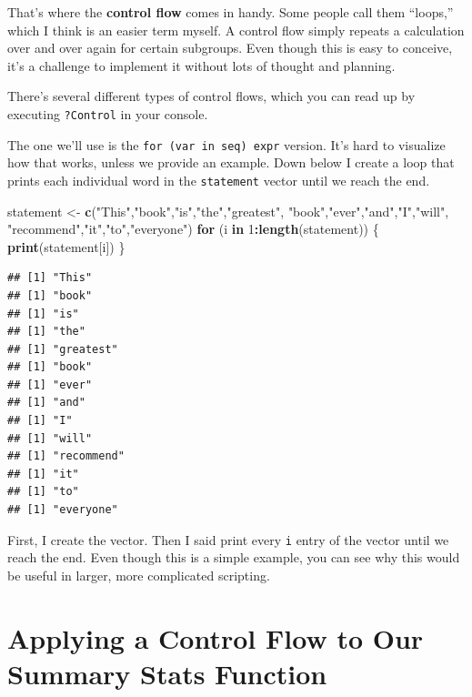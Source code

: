 \documentclass[
]{book}
\newenvironment{Shaded}{\begin{snugshade}}{\end{snugshade}}
\newcommand{\ControlFlowTok}[1]{\textcolor[rgb]{0.13,0.29,0.53}{\textbf{#1}}}
\newcommand{\DecValTok}[1]{\textcolor[rgb]{0.00,0.00,0.81}{#1}}
\newcommand{\KeywordTok}[1]{\textcolor[rgb]{0.13,0.29,0.53}{\textbf{#1}}}
\newcommand{\NormalTok}[1]{#1}
\newcommand{\OperatorTok}[1]{\textcolor[rgb]{0.81,0.36,0.00}{\textbf{#1}}}
\newcommand{\StringTok}[1]{\textcolor[rgb]{0.31,0.60,0.02}{#1}}
\begin{document}
\begin{center}
That's where the \textbf{control flow} comes in handy. Some people call them ``loops,'' which I think is an easier term myself. A control flow simply repeats a calculation over and over again for certain subgroups. Even though this is easy to conceive, it's a challenge to implement it without lots of thought and planning.

There's several different types of control flows, which you can read up by executing \texttt{?Control} in your console.

The one we'll use is the \texttt{for\ (var\ in\ seq)\ expr} version. It's hard to visualize how that works, unless we provide an example. Down below I create a loop that prints each individual word in the \texttt{statement} vector until we reach the end.

\begin{Shaded}
\begin{Highlighting}[]
\NormalTok{statement <-}\StringTok{ }\KeywordTok{c}\NormalTok{(}\StringTok{"This"}\NormalTok{,}\StringTok{"book"}\NormalTok{,}\StringTok{"is"}\NormalTok{,}\StringTok{"the"}\NormalTok{,}\StringTok{"greatest"}\NormalTok{,}
               \StringTok{"book"}\NormalTok{,}\StringTok{"ever"}\NormalTok{,}\StringTok{"and"}\NormalTok{,}\StringTok{"I"}\NormalTok{,}\StringTok{"will"}\NormalTok{,}
               \StringTok{"recommend"}\NormalTok{,}\StringTok{"it"}\NormalTok{,}\StringTok{"to"}\NormalTok{,}\StringTok{"everyone"}\NormalTok{)}
\ControlFlowTok{for}\NormalTok{ (i }\ControlFlowTok{in} \DecValTok{1}\OperatorTok{:}\KeywordTok{length}\NormalTok{(statement)) \{}
  \KeywordTok{print}\NormalTok{(statement[i])}
\NormalTok{\}}
\end{Highlighting}
\end{Shaded}

\begin{verbatim}
## [1] "This"
## [1] "book"
## [1] "is"
## [1] "the"
## [1] "greatest"
## [1] "book"
## [1] "ever"
## [1] "and"
## [1] "I"
## [1] "will"
## [1] "recommend"
## [1] "it"
## [1] "to"
## [1] "everyone"
\end{verbatim}

First, I create the vector. Then I said print every \texttt{i} entry of the vector until we reach the end. Even though this is a simple example, you can see why this would be useful in larger, more complicated scripting.

\hypertarget{applying-a-control-flow-to-our-summary-stats-function}{%
\section{Applying a Control Flow to Our Summary Stats Function}\label{applying-a-control-flow-to-our-summary-stats-function}}


\end{center}
\end{document}
